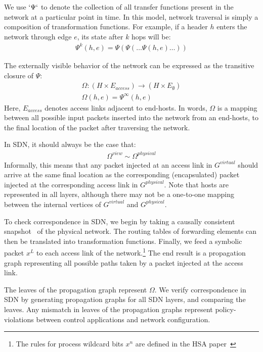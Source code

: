 We use $`\Psi`$ to denote the collection of all transfer functions present in
the network at a particular point in time. In this model, network traversal is simply a composition of transformation
functions. For example, if a header $h$ enters the network through edge
$e$, its state after $k$ hops will be:
\begin{align*}
\Psi^k(h,e) = \Psi(\Psi(\dots \Psi(h,e)\dots))
\end{align*}

The externally visible behavior of the network can be expressed as the
transitive closure of $\Psi$:
\begin{align*}
\Omega: (H \times E_{access}) \rightarrow (H \times E_{\emptyset}) \\
\Omega(h,e) = \Psi^{\infty}(h,e)
\end{align*}
Here, $E_{access}$ denotes access links adjacent to end-hosts.
In words, $\Omega$ is a mapping between all possible input packets inserted
into the network from an end-hosts, to the final location of the packet after
traversing the network.

In SDN, it should always be the case that:
\begin{align*}
\Omega^{view} \sim \Omega^{physical}
\end{align*}
Informally, this means that any packet injected at an access link in $G^{virtual}$ should arrive at
the same final location as the corresponding (encapsulated) packet injected at the
corresponding access link in $G^{physical}$. Note that hosts are represented
in all layers, although there may not be a one-to-one mapping between the
internal vertices of $G^{virtual}$ and $G^{physical}$.

To check correspondence in SDN, we begin by taking a causally consistent
snapshot~\cite{Chandy:1985:DSD:214451.214456} of the physical network. The routing
tables of forwarding elements can then be translated into transformation functions.
Finally, we feed a symbolic packet $x^L$ to each access link of the
network.\footnote{The rules for process wildcard bits $x^n$ are defined in
the HSA paper~\cite{hsa}} The end result is a propagation graph representing all possible paths taken by a packet injected
at the access link.

The leaves of the propagation graph represent $\Omega$. We
verify correspondence in SDN by generating propagation graphs for all SDN layers,
and comparing the leaves. Any mismatch in leaves of the propagation graphs
represent policy-violations between control applications and network
configuration.


